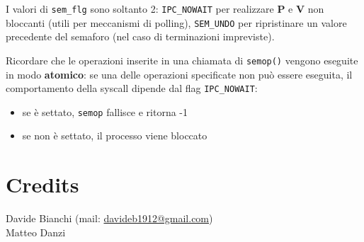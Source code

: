 \documentclass[a4paper]{article}
\begin{document}
I valori di \verb|sem_flg| sono soltanto 2: \verb|IPC_NOWAIT| per realizzare \textbf{P} e \textbf{V} non bloccanti (utili per meccanismi di polling), \verb|SEM_UNDO| per ripristinare un valore precedente del semaforo (nel caso di terminazioni impreviste).\newpage

Ricordare che le operazioni inserite in una chiamata di \verb|semop()| vengono eseguite in modo \textbf{atomico}: se una delle operazioni specificate non può essere eseguita, il comportamento della syscall dipende dal flag \verb|IPC_NOWAIT|:
\begin{itemize}
\item se è settato, \verb|semop| fallisce e ritorna -1
\item se non è settato, il processo viene bloccato
\end{itemize}
\newpage

\section{Credits}
Davide Bianchi (mail: \url{davideb1912@gmail.com}) \\
Matteo Danzi
\end{document}
